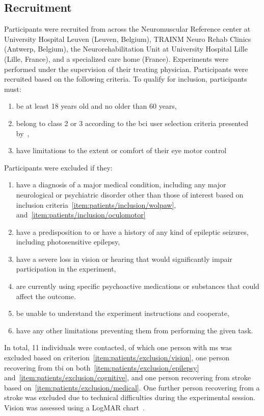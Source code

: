 \subsection{Recruitment}
Participants were recruited from across the Neuromuscular Reference center at
University Hospital Leuven (Leuven, Belgium), TRAINM Neuro Rehab Clinics
(Antwerp, Belgium), the Neurorehabilitation Unit at University Hospital Lille
(Lille, France), and a specialized care home (France).
Experiments were performed under the supervision of their treating physician.
Participants were recruited based on the following criteria.
To qualify for inclusion, participants must:
\begin{enumerate}
	\item be at least 18 years old and no older than 60
	years,
  \item belong to class 2 or 3 according to the \ac{bci}	user selection criteria
    presented by~\textcite{Wolpaw2006},\label{item:patients/inclusion/wolpaw}
  \item have limitations to the extent or comfort of their eye motor control\label{item:patients/inclusion/oculomotor}
\end{enumerate}
Participants were excluded if they:
\begin{enumerate}
  \item have a diagnosis of a major medical condition, including any major
    neurological or psychiatric disorder other than those of interest based on
    inclusion criteria~\ref{item:patients/inclusion/wolpaw},
    and~\ref{item:patients/inclusion/oculomotor}\label{item:patients/exclusion/medical}
  \item have a predisposition to or have a history of any kind of epileptic seizures,
    including photosensitive epilepsy,\label{item:patients/exclusion/epilepsy}
  \item have a severe loss in vision or hearing that would significantly impair
        participation in the experiment,\label{item:patients/exclusion/vision}
  \item are currently using specific psychoactive medications or substances that could affect the outcome.\label{item:patients/exclusion/cognitive}
  \item be unable to understand the experiment instructions and cooperate,
  \item have any other limitations preventing them from performing the given task.
\end{enumerate}

In total, 11 individuals were contacted, of which one person with \ac{ms} was excluded based on
criterion~\ref{item:patients/exclusion/vision}, one person recovering from
\ac{tbi} on
both~\ref{item:patients/exclusion/epilepsy}
and~\ref{item:patients/exclusion/cognitive}, and one person recovering from
stroke based
on~\ref{item:patients/exclusion/medical}.
One further person recovering from a stroke was excluded due to technical
difficulties during the experimental session.
Vision was assessed using a LogMAR chart~\cite{Bailey1976}.

